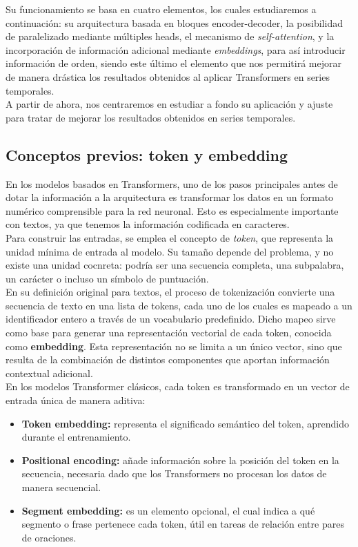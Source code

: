 Su funcionamiento se basa en cuatro elementos, los cuales estudiaremos a continuación: su arquitectura basada en bloques encoder-decoder, la posibilidad de paralelizado mediante múltiples heads, el mecanismo de \textit{self-attention}, y la incorporación de información adicional mediante \textit{embeddings}, para así introducir información de orden, siendo este último el elemento que nos permitirá mejorar de manera drástica los resultados obtenidos al aplicar Transformers en series temporales.\\

A partir de ahora, nos centraremos en estudiar a fondo su aplicación y ajuste para tratar de mejorar los resultados obtenidos en series temporales.

\subsection{Conceptos previos: token y embedding}

En los modelos basados en Transformers, uno de los pasos principales antes de dotar la información a la arquitectura es transformar los datos en un formato numérico comprensible para la red neuronal. Esto es especialmente importante con textos, ya que tenemos la información codificada en caracteres.\\

Para construir las entradas, se emplea el concepto de \textit{token}, que representa la unidad mínima de entrada al modelo. Su tamaño depende del problema, y no existe una unidad cocnreta: podría ser una secuencia completa, una subpalabra, un carácter o incluso un símbolo de puntuación.\\

En su definición original para textos, el proceso de tokenización convierte una secuencia de texto en una lista de tokens, cada uno de los cuales es mapeado a un identificador entero a través de un vocabulario predefinido. Dicho mapeo sirve como base para generar una representación vectorial de cada token, conocida como \textbf{embedding}. Esta representación no se limita a un único vector, sino que resulta de la combinación de distintos componentes que aportan información contextual adicional.\\

En los modelos Transformer clásicos, cada token es transformado en un vector de entrada única de manera aditiva:

\begin{itemize}
    \item \textbf{Token embedding:} representa el significado semántico del token, aprendido durante el entrenamiento.
    \item \textbf{Positional encoding:} añade información sobre la posición del token en la secuencia, necesaria dado que los Transformers no procesan los datos de manera secuencial.
    \item \textbf{Segment embedding:} es un elemento opcional, el cual indica a qué segmento o frase pertenece cada token, útil en tareas de relación entre pares de oraciones.
\end{itemize}

